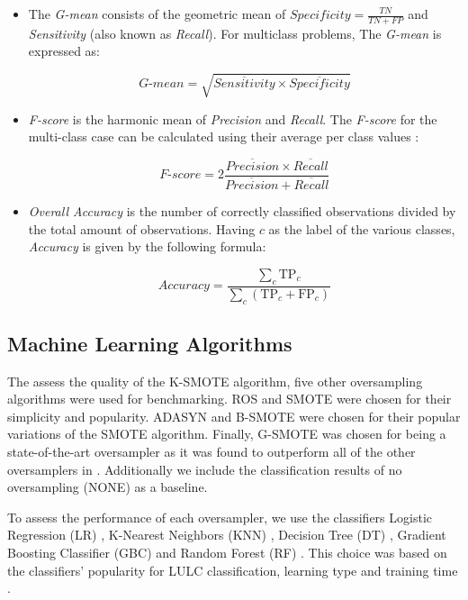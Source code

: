 \documentclass[parskip=full]{scrartcl}
\begin{document}
\begin{itemize}
	\item The \textit{G-mean} consists of the geometric mean of
	      $Specificity = \frac{TN}{TN + FP}$ and \textit{Sensitivity} (also known as \textit{Recall}). For multiclass problems, The
	      \textit{G-mean} is expressed as:

	      $$\textit{G-mean} = \sqrt{ \overline{Sensitivity} \times
			      \overline{Specificity}}$$

	\item \textit{F-score} is the harmonic mean of \textit{Precision} and
	      \textit{Recall}. The \textit{F-score} for the multi-class case can
	      be calculated using their average per class values \cite{He2009}:

	      $$\textit{F-score}=2\frac{\overline{Precision} \times \overline{Recall}}{\overline{Precision} +
			      \overline{Recall}}$$

	\item \textit{Overall Accuracy} is the number of correctly classified observations
	      divided by the total amount of observations. Having \( c \) as the label of the
	      various classes, \textit{Accuracy} is given by the following formula:

	      $$\textit{Accuracy} = \frac{ \sum\limits_{c}{ \text{TP}_{c} } }{
			      \sum\limits_{c}{ (\text{TP}_{c}  + \text{FP}_{c}) } } $$

\end{itemize}

\subsection{Machine Learning Algorithms}
The assess the quality of the K-SMOTE algorithm, five other oversampling
algorithms were used for benchmarking. ROS and SMOTE were chosen for their
simplicity and popularity. ADASYN and B-SMOTE were chosen for their popular
variations of the SMOTE algorithm. Finally, G-SMOTE was chosen for being a
state-of-the-art oversampler as it was found to outperform all of the other
oversamplers in \cite{Douzas2019rs}. Additionally we include the classification
results of no oversampling (NONE) as a baseline.

To assess the performance of each oversampler, we use the classifiers Logistic
Regression (LR) \cite{McCullagh1989}, K-Nearest Neighbors (KNN)
\cite{Cover1967}, Decision Tree (DT) \cite{Salzberg1994}, Gradient Boosting
Classifier (GBC) \cite{Friedman2001} and Random Forest (RF) \cite{Liaw2002}.
This choice was based on the classifiers' popularity for LULC classification,
learning type and training time \cite{Maxwell2018,Gavade2019}.
\end{document}
